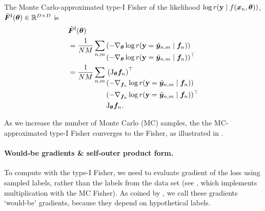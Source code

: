 \begin{definition}\label{def:mc_fisher}%
  The Monte Carlo-approximated type-I Fisher of the likelihood $\log r({\mathbf{y}} \mid f({\bm{x}}_n, {\bm{\theta}}))$,
  $\tilde{{\bm{F}}}^{\text{I}}({\bm{\theta}}) \in {\mathbb{R}}^{D \times D}$ is
  \begin{align*}
    & \tilde{{\bm{F}}}^{\text{I}}({\bm{\theta}}) \\
    & = \frac{1}{NM} \sum_{n,m}
      \begin{aligned}[t]
        & (-\nabla_{{\bm{\theta}}} \log r({\mathbf{y}} = \tilde{{\bm{y}}}_{n,m} \mid {\bm{f}}_n))        \\
        & (-\nabla_{{\bm{\theta}}} \log r({\mathbf{y}} = \tilde{{\bm{y}}}_{n,m} \mid {\bm{f}}_n))^{\top} \\
      \end{aligned} \\
    & = \frac{1}{NM} \sum_{n,m}
      \begin{aligned}[t]
        & \left(\mathrm{J}_{{\bm{\theta}}}{\bm{f}}_n\right)^{\top}                              \\
        & (-\nabla_{{\bm{f}}_n} \log r({\mathbf{y}} = \tilde{{\bm{y}}}_{n,m} \mid {\bm{f}}_n))        \\
        & (-\nabla_{{\bm{f}}_n} \log r({\mathbf{y}} = \tilde{{\bm{y}}}_{n,m} \mid {\bm{f}}_n))^{\top} \\
        & \mathrm{J}_{{\bm{\theta}}}{\bm{f}}_n.
      \end{aligned}
  \end{align*}
\end{definition}
As we increase the number of Monte Carlo (MC) samples, the the MC-approximated type-I Fisher converges to the Fisher, as illustrated in .

\paragraph{Would-be gradients \& self-outer product form.}
To compute with the type-I Fisher, we need to evaluate gradient of the loss using sampled labels, rather than the labels from the data set (see , which implements multiplication with the MC Fisher).
As coined by \citet{papyan2020traces}, we call these gradients `would-be' gradients, because they depend on hypothetical labels.

